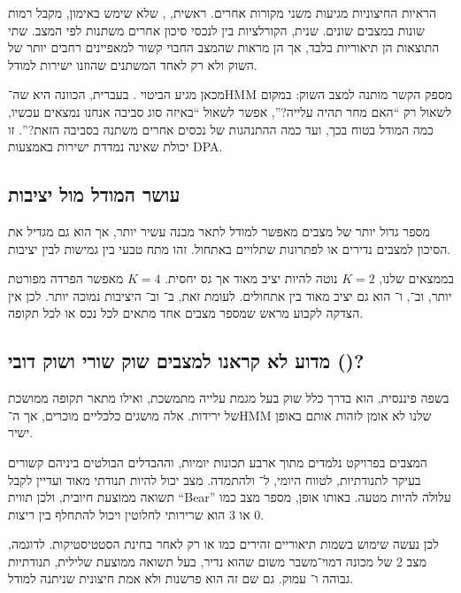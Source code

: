 הראיות החיצוניות מגיעות משני מקורות אחרים. ראשית, , שלא שימש באימון, מקבל רמות שונות במצבים שונים. שנית, הקורלציות בין  לנכסי סיכון אחרים משתנות לפי המצב. שתי התוצאות הן תיאוריות בלבד, אך הן מראות שהמצב החבוי קשור למאפיינים רחבים יותר של השוק ולא רק לאחד המשתנים שהוזנו ישירות למודל.

מכאן מגיע הביטוי . בעברית, הכוונה היא שה־HMM מספק הקשר מותנה למצב השוק: במקום לשאול רק ``האם מחר תהיה עלייה?'', אפשר לשאול ``באיזה סוג סביבה אנחנו נמצאים עכשיו, כמה המודל בטוח בכך, ועד כמה ההתנהגות של נכסים אחרים משתנה בסביבה הזאת?''. זו יכולת שאינה נמדדת ישירות באמצעות DPA.

\subsection{עושר המודל מול יציבות}

מספר גדול יותר של מצבים מאפשר למודל לתאר מבנה עשיר יותר, אך הוא גם מגדיל את הסיכון למצבים נדירים או לפתרונות שתלויים באתחול. זהו מתח טבעי בין גמישות לבין יציבות.

בממצאים שלנו, \(K=2\) נוטה להיות יציב מאוד אך גס יחסית. \(K=4\) מאפשר הפרדה מפורטת יותר, וב־,  ו־ הוא גם יציב מאוד בין אתחולים. לעומת זאת, ב־ וב־ היציבות נמוכה יותר. לכן אין הצדקה לקבוע מראש שמספר מצבים אחד מתאים לכל נכס או לכל תקופה.

\subsection{מדוע לא קראנו למצבים שוק שורי ושוק דובי ()?}

בשפה פיננסית,  הוא בדרך כלל שוק בעל מגמת עלייה מתמשכת, ואילו  מתאר תקופה ממושכת של ירידות. אלה מושגים כלכליים מוכרים, אך ה־HMM שלנו לא אומן לזהות אותם באופן ישיר.

המצבים בפרויקט נלמדים מתוך ארבע תכונות יומיות, וההבדלים הבולטים ביניהם קשורים בעיקר לתנודתיות, לטווח היומי, ל־ ולהתמדה. מצב יכול להיות תנודתי מאוד ועדיין לקבל תשואה ממוצעת חיובית, ולכן תווית ``Bear'' עלולה להיות מטעה. באותו אופן, מספר מצב כמו 0 או 3 הוא שרירותי לחלוטין ויכול להתחלף בין ריצות.

לכן נעשה שימוש בשמות תיאוריים זהירים כמו  או  רק לאחר בחינת הסטטיסטיקות. לדוגמה, מצב 2 של  מכונה דמוי־משבר משום שהוא נדיר, בעל תשואה ממוצעת שלילית, תנודתיות גבוהה ו־ עמוק. גם שם זה הוא פרשנות ולא אמת חיצונית שניתנה למודל.

